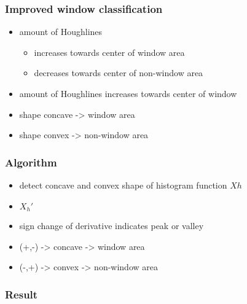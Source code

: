 \documentclass{beamer}
\begin{document}
\frame
{
}

\frame
{
	\frametitle{Improved window classification}
	\begin{itemize}
	\item <+-| alert@+> amount of Houghlines 
		\begin{itemize}
		\item <+-| alert@+> increases towards center of window area
		\item <+-| alert@+> decreases towards center of non-window area
		\end{itemize}
	\item <+-| alert@+> amount of Houghlines increases towards center of window
	\item <+-| alert@+> shape concave -> window area
	\item <+-| alert@+> shape convex -> non-window area
	\end{itemize}
}
\frame
{
}

\frame
{
	\frametitle{Algorithm}
	\begin{itemize}
	\item <+-| alert@+> detect concave and convex shape of histogram function $Xh$
	\item <+-| alert@+> $X_{h}'$ 
	\item <+-| alert@+> sign change of derivative indicates peak or valley
	\item <+-| alert@+> (+,-) -> concave -> window area
	\item <+-| alert@+> (-,+) -> convex -> non-window area
	\end{itemize}
}

\frame
{
	\frametitle{Result}
}

\frame
{
}

\frame
{
}
\end{document}
